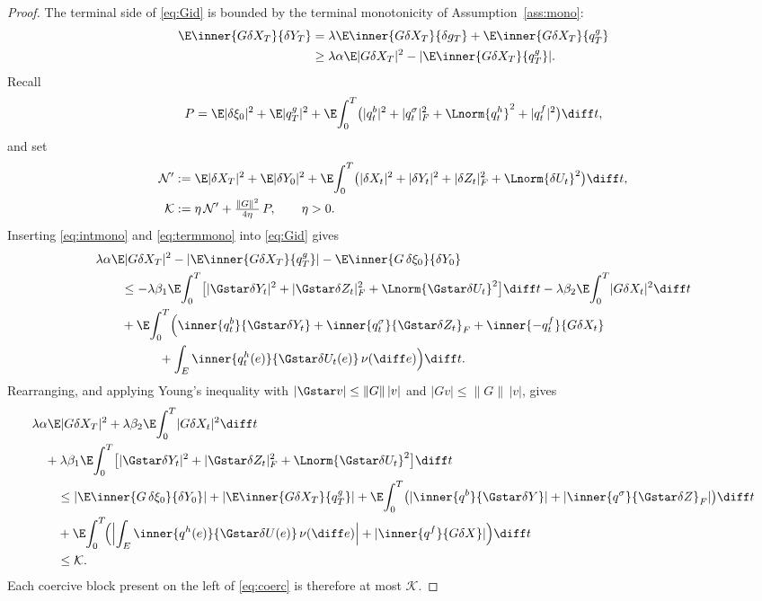 \begin{proof}
The terminal side of \eqref{eq:Gid} is bounded by the terminal monotonicity of
Assumption~\ref{ass:mono}:
\begin{equation}\label{eq:termmono}
\begin{aligned}
\E\inner{G\delta X_T}{\delta Y_T}
&=\lambda\E\inner{G\delta X_T}{\delta g_T}+\E\inner{G\delta X_T}{q^g_T}\\
&\ge\lambda\alpha\E|G\delta X_T|^2-|\E\inner{G\delta X_T}{q^g_T}| .
\end{aligned}
\end{equation}
Recall
\[
P=\E|\delta\xi_0|^2+\E|q^g_T|^2
+\E\!\int_0^T\!\big(|q^b_t|^2+|q^\sigma_t|_F^2+\Lnorm{q^h_t}^2+|q^f_t|^2\big)\diff t ,
\]
and set
\[
\begin{aligned}
\mathcal N'&:=\E|\delta X_T|^2+\E|\delta Y_0|^2
+\E\!\int_0^T\!\big(|\delta X_t|^2+|\delta Y_t|^2+|\delta Z_t|_F^2+\Lnorm{\delta U_t}^2\big)\diff t ,\\
\mathcal K&:=\eta\,\mathcal N'+\tfrac{\|G\|^2}{4\eta}\,P ,\qquad \eta>0 .
\end{aligned}
\]
Inserting \eqref{eq:intmono} and \eqref{eq:termmono} into \eqref{eq:Gid} gives
\[
\begin{aligned}
&\lambda\alpha\E|G\delta X_T|^2-|\E\inner{G\delta X_T}{q^g_T}|-\E\inner{G\,\delta\xi_0}{\delta Y_0}\\
&\qquad\le-\lambda\beta_1\E\!\int_0^T\!\big[|\Gstar\delta Y_t|^2+|\Gstar\delta Z_t|_F^2+\Lnorm{\Gstar\delta U_t}^2\big]\diff t
-\lambda\beta_2\E\!\int_0^T\!|G\delta X_t|^2\diff t\\
&\qquad+\E\!\int_0^T\!\Big(\inner{q^b_t}{\Gstar\delta Y_t}+\inner{q^\sigma_t}{\Gstar\delta Z_t}_F
+\inner{-q^f_t}{G\delta X_t}\\
&\qquad\qquad\quad+\int_E\inner{q^h_t(e)}{\Gstar\delta U_t(e)}\,\nu(\diff e)\Big)\diff t .
\end{aligned}
\]
Rearranging, and applying Young's inequality with $|\Gstar v|\le\|G\|\,|v|$ and
$|Gv|\le\|G\|\,|v|$, gives
\begin{equation}\label{eq:coerc}
\begin{aligned}
&\lambda\alpha\E|G\delta X_T|^2+\lambda\beta_2\E\!\int_0^T\!|G\delta X_t|^2\diff t\\
&\quad+\lambda\beta_1\E\!\int_0^T\!\big[|\Gstar\delta Y_t|^2+|\Gstar\delta Z_t|_F^2+\Lnorm{\Gstar\delta U_t}^2\big]\diff t\\
&\qquad\le|\E\inner{G\,\delta\xi_0}{\delta Y_0}|+|\E\inner{G\delta X_T}{q^g_T}|
+\E\!\int_0^T\!\big(|\inner{q^b}{\Gstar\delta Y}|+|\inner{q^\sigma}{\Gstar\delta Z}_F|\big)\diff t\\
&\qquad+\E\!\int_0^T\!\Bigl(\Bigl|\int_E\inner{q^h(e)}{\Gstar\delta U(e)}\,\nu(\diff e)\Bigr|
+|\inner{q^f}{G\delta X}|\Bigr)\diff t\\
&\qquad\le\mathcal K .
\end{aligned}
\end{equation}
Each coercive block present on the left of \eqref{eq:coerc} is therefore at most
$\mathcal K$.


\end{proof}
